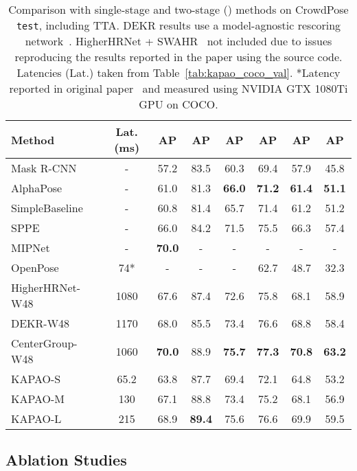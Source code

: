\documentclass[runningheads]{llncs}
\newcommand\hll[1]{\bgroup
  \hskip0pt\color{black}#1\egroup
}
\begin{document}
\begin{table}[t!]
\footnotesize
\centering
\begin{tabular}{l|c|c|c|c|c|c|c}
	\hline
	Method & \hll{Lat. (ms)} & AP & AP & AP & AP & AP & AP\\
	\hline
	Mask R-CNN~\cite{he2017mask} & - & 57.2 & 83.5 & 60.3 & 69.4 & 57.9 & 45.8 \\
	AlphaPose~\cite{fang2017rmpe} & - & 61.0 & 81.3 & \textbf{66.0} & \textbf{71.2} & \textbf{61.4} & \textbf{51.1} \\
	\hll{SimpleBaseline~\cite{xiao2018simple}} & - & 60.8 & 81.4 & 65.7 & 71.4 & 61.2 & 51.2 \\
	SPPE~\cite{li2019crowdpose} & - & 66.0 & 84.2 & 71.5 & 75.5 & 66.3 & 57.4 \\
	MIPNet~\cite{khirodkar2021multi} & - & \textbf{70.0} & - & - & - & - & - \\
	\hline
	OpenPose~\cite{cao2017realtime} & 74* & - & - & - & 62.7 & 48.7 & 32.3 \\
	HigherHRNet-W48~\cite{cheng2020higherhrnet} & 1080 & 67.6 & 87.4 & 72.6 & 75.8 & 68.1 & 58.9\\
DEKR-W48~\cite{geng2021bottom} & 1170 & 68.0 & 85.5 & 73.4 & 76.6 & 68.8 & 58.4\\
	\hll{CenterGroup-W48~\cite{braso2021center}} & 1060 & \textbf{70.0} & 88.9 & \textbf{75.7} & \textbf{77.3} & \textbf{70.8} & \textbf{63.2} \\
	KAPAO-S & 65.2 & 63.8 & 87.7 & 69.4 & 72.1 & 64.8 & 53.2 \\
	KAPAO-M & 130 & 67.1 & 88.8 & 73.4 & 75.2 & 68.1 & 56.9 \\
	KAPAO-L & 215 & 68.9 & \textbf{89.4} & 75.6 & 76.6 & 69.9 & 59.5 \\
	\hline
\end{tabular}
\smallskip
\caption[KAPAO compared to state-of-the-art two-stage and single-stage methods on CrowdPose.]{Comparison with single-stage and two-stage () methods on CrowdPose \texttt{test}, including TTA. DEKR results use a model-agnostic rescoring network~\cite{geng2021bottom}. \hll{HigherHRNet + SWAHR~\cite{luo2021rethinking} not included due to issues reproducing the results reported in the paper using the source code. Latencies (Lat.) taken from Table~\ref{tab:kapao_coco_val}. *Latency reported in original paper~\cite{cao2018openpose} and measured using NVIDIA GTX 1080Ti GPU on COCO.}}
\label{tab:kapao_crowdpose_test}
\end{table}

\subsection{Ablation Studies}
\label{sec:kapao_ablation}
\end{document}
